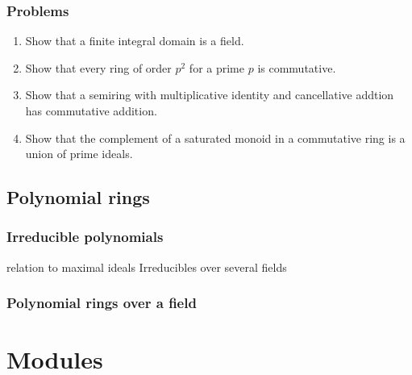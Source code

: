 \documentclass{../../large}
\begin{document}
\section*{Problems}
\begin{enumerate}
\item Show that a finite integral domain is a field.
\item Show that every ring of order $p^2$ for a prime $p$ is commutative.
\item Show that a semiring with multiplicative identity and cancellative addtion has commutative addition.
\item Show that the complement of a saturated monoid in a commutative ring is a union of prime ideals.
\end{enumerate}


\chapter{Polynomial rings}
\section{Irreducible polynomials}
relation to maximal ideals
Irreducibles over several fields
\begin{prb}
\end{prb}
\begin{prb}
\end{prb}

\section{Polynomial rings over a field}
\begin{prb}
\end{prb}
\begin{prb}
\end{prb}
\begin{prb}
\end{prb}











\part{Modules}
\end{document}
